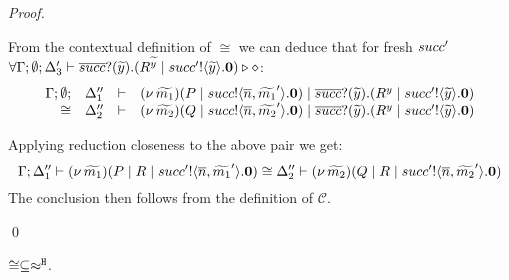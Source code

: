 \begin{proof}
\begin{itemize}
\begin{itemize}
							From the contextual definition of $\cong$ we can deduce that for fresh $succ'$
							$\forall \Gamma; \emptyset; \Delta_3' \vdash \overline{succ} ? (\widetilde{y}) . (R^{\widetilde{y}} \;|\; succ' ! \langle \widetilde{y} \rangle . \mathbf{0}) \triangleright \diamond$:
							\[
								\begin{array}{rcll} \Gamma; \emptyset; &\Delta_1''& \vdash& (\nu\, \widetilde{m_1})(P \;|\; succ ! \langle \overline{n}, \widetilde{m_1}' \rangle . \mathbf{0})
									\;|\; \overline{succ} ? (\widetilde{y}) . (R^{y} \;|\; succ' ! \langle \widetilde{y} \rangle . \mathbf{0})\\ \cong &\Delta_2''& \vdash &  (\nu\, \widetilde{m_2})(Q \;|\; succ ! \langle \overline{n}, \widetilde{m_2}' \rangle . \mathbf{0})
									\;|\; \overline{succ} ? (\widetilde{y}) . (R^{y} \;|\; succ' ! \langle \widetilde{y} \rangle . \mathbf{0}) \end{array}
							\]

							\noi Applying reduction closeness to the above pair we get:
							\[
								\Gamma; \Delta_1'' \vdash (\nu\, \widetilde{m_1})(P \;|\; R \;|\; succ' ! \langle \overline{n}, \widetilde{m_1}' \rangle . \mathbf{0}) \cong \Delta_2'' \vdash (\nu\, \widetilde{m_2})(Q \;|\; R \;|\; succ' ! \langle \overline{n}, \widetilde{m_2}' \rangle . \mathbf{0})
							\]
						\noi The conclusion then follows from the definition of $\mathcal{C}$.
	    \end{itemize}
	\end{itemize}
	\qed
\end{proof}


\begin{lemma}\rm
	\label{app:lem:cong_is_wb}
	$\cong \subseteq \approx^\mathtt{H}$.
\end{lemma}

